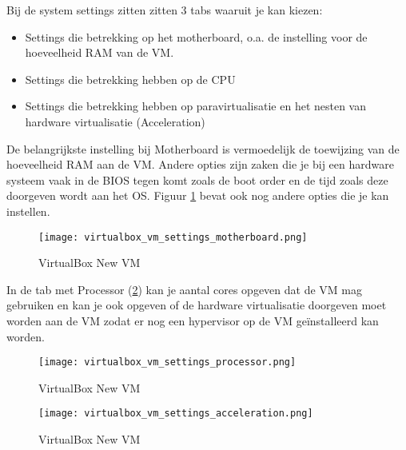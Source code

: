 Bij de system settings zitten zitten 3 tabs waaruit je kan kiezen:
\begin{itemize}
	\item Settings die betrekking op het motherboard, o.a. de instelling voor de hoeveelheid RAM van de VM.
	\item Settings die betrekking hebben op de CPU
	\item Settings die betrekking hebben op paravirtualisatie en het nesten van hardware virtualisatie (Acceleration)
\end{itemize}

De belangrijkste instelling bij Motherboard is vermoedelijk de toewijzing van de hoeveelheid RAM aan de VM. Andere opties zijn zaken die je bij een hardware systeem vaak in de BIOS tegen komt zoals de boot order en de tijd zoals deze doorgeven wordt aan het OS. Figuur \ref{VB_settings_system_mb} bevat ook nog andere opties die je kan instellen.
\begin{figure}[H]
	\centering
	\texttt{[image: virtualbox\_vm\_settings\_motherboard.png]}
	\caption{VirtualBox New VM}
	\label{VB_settings_system_mb}
\end{figure}

In de tab met Processor (\ref{VB_settings_system_cpu}) kan je aantal cores opgeven dat de VM mag gebruiken en kan je ook opgeven of de hardware virtualisatie doorgeven moet worden aan de VM zodat er nog een hypervisor op de VM ge\"installeerd kan worden.
\begin{figure}[H]
	\centering
	\texttt{[image: virtualbox\_vm\_settings\_processor.png]}
	\caption{VirtualBox New VM}
	\label{VB_settings_system_cpu}
\end{figure}


\begin{figure}[H]
	\centering
	\texttt{[image: virtualbox\_vm\_settings\_acceleration.png]}
	\caption{VirtualBox New VM}
	\label{VB_New_VM}
\end{figure}

